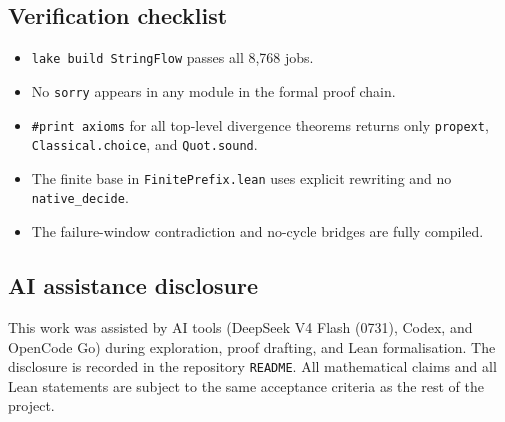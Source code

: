 \subsection{Verification checklist}

\begin{itemize}[leftmargin=*]
\item \texttt{lake build StringFlow} passes all 8,768 jobs.
\item No \texttt{sorry} appears in any module in the formal proof chain.
\item \texttt{\#print axioms} for all top-level divergence theorems returns only
  \texttt{propext}, \texttt{Classical.choice}, and
  \texttt{Quot.sound}.
\item The finite base in \texttt{FinitePrefix.lean} uses explicit
  rewriting and no \texttt{native\_decide}.
\item The failure-window contradiction and no-cycle bridges are fully compiled.
\end{itemize}

\subsection{AI assistance disclosure}

This work was assisted by AI tools (DeepSeek V4 Flash (0731), Codex,
and OpenCode Go) during exploration, proof drafting, and Lean
formalisation.  The disclosure is recorded in the repository
\texttt{README}.  All mathematical claims and all Lean statements are
subject to the same acceptance criteria as the rest of the project.
